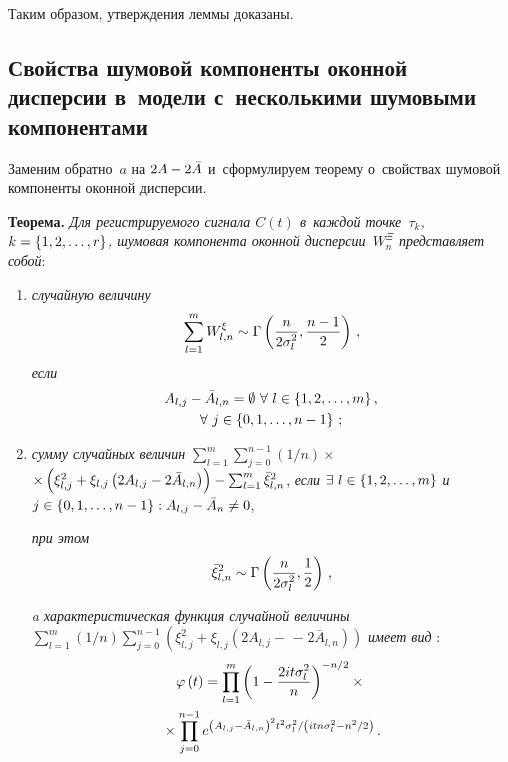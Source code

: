 \begin{multicols}{2}
Таким образом, утверждения леммы  доказаны.

\subsection{Свойства шумовой компоненты оконной дисперсии в~модели 
с~несколькими шумовыми компонентами}

    Заменим обратно~$a$ на $ 2A\hm-2\bar{A}$ и~сформулируем 
    теорему о~свойствах шумовой компоненты оконной дисперсии.

\smallskip

\noindent
    \textbf{Теорема.}
\textit{Для регистрируемого сигнала $C\left(t \right)$ в~каж\-дой точке~$\tau_{k}$, 
$k\hm= \left\lbrace  1, 2, \ldots, r\right\rbrace$, шумовая компонента 
оконной дисперсии~$W_{n}^{\Xi}$ представляет собой}:
\begin{enumerate}[($i$)]
    \item \textit{случайную величину} 
    $$
    \sum\limits_{l=1}^{m} W_{l,n}^{\xi}\sim 
    \Gamma\left(\displaystyle\frac{\displaystyle n\mathstrut}{\displaystyle 2\sigma_{l}^{2}\mathstrut}, \displaystyle\frac{\displaystyle n-1\mathstrut}{\displaystyle 2\mathstrut}\right)\,,
    $$ 
    \textit{если} 
   \begin{multline*}
     A_{l,j} \hm- \bar{A}_{l,n}= \emptyset \ \forall\ 
     l  \hm\in \left\lbrace 1, 2, \ldots, m\right\rbrace ,\\
      \forall\ 
     j \hm\in \left\lbrace 0, 1, \ldots, n-1\right\rbrace\,;
     \end{multline*}
    
    \item \textit{сумму случайных величин} 
    $\sum\nolimits_{l=1}^{m}\sum\nolimits_{j=0}^{n-1}({1}/{n})\times$\linebreak
$\times     \left( \xi_{l,j}^{2}\hm+\xi_{l,j} \left( 2A_{l,j}\hm-2\bar{A}_{l,n}\right)\right)  \hm-
       \sum\nolimits_{l=1}^{m}\bar{\xi}_{l,n}^{2}$, 
       \textit{если} $\exists\ l \hm\in \left\lbrace 1, 2, \ldots, m\right\rbrace$
\textit{и}  $j \hm\in \left\lbrace 0, 1, \ldots, n-1\right\rbrace :
    A_{l,j}\hm - \bar{A}_{n} \hm\neq 0$,
    
    \textit{при этом}
    $$
    \bar{\xi}_{l,n}^{2}  \sim  \Gamma\left( \displaystyle\frac{\displaystyle n\mathstrut}{\displaystyle 2\sigma_{l}^{2}\mathstrut}, 
    \displaystyle\frac{\displaystyle 1\mathstrut}{\displaystyle 2\mathstrut}\right)\,,
    $$ 
    
    \textit{a характеристическая функция случайной величины} 
    $\sum\nolimits_{l=1}^{m}(1/n) \!\sum\nolimits_{j=0}^{n-1}\!\left( \xi_{l,j}^{2} + 
    \xi_{l,j} \left( 2A_{l,j}-\right.\right.$\linebreak 
    $\left.\left.-\;2\bar{A}_{l,n}\right)\!\right)$ 
    \textit{имеет вид} : 
    \begin{multline*}
    \varphi\left( t\right) \hm= \prod\limits_{l=1}^{m} 
    \left( 1-\fr{2it\sigma_l^2}{n}\right)^{-{n}/{2}}\times{}\\
    {}\times  
    \prod\limits_{j=0}^{n-1} e^{{\left(A_{l,j}-\bar{A}_{l,n}\right)^{2}t^{2}
    \sigma^{2}_{l}}/\left({itn\sigma^{2}_{l} - {n^{2}}/2}\right)}\,.
    \end{multline*}
    

\end{enumerate}
\end{multicols}
